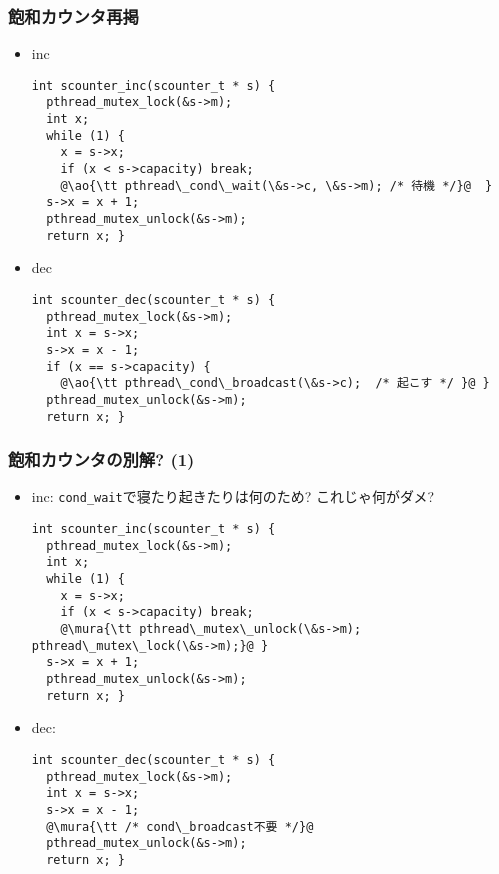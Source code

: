 \documentclass[12pt,dvipdfmx]{beamer}
\begin{document}
\begin{frame}[fragile]
  \frametitle{飽和カウンタ再掲}
  \begin{itemize}
  \item inc
\begin{lstlisting}
int scounter_inc(scounter_t * s) {
  pthread_mutex_lock(&s->m);
  int x;
  while (1) {
    x = s->x;
    if (x < s->capacity) break;
    @\ao{\tt pthread\_cond\_wait(\&s->c, \&s->m); /* 待機 */}@  }
  s->x = x + 1;
  pthread_mutex_unlock(&s->m);
  return x; }
\end{lstlisting}

\item dec
\begin{lstlisting}
int scounter_dec(scounter_t * s) {
  pthread_mutex_lock(&s->m);
  int x = s->x;
  s->x = x - 1;
  if (x == s->capacity) {
    @\ao{\tt pthread\_cond\_broadcast(\&s->c);  /* 起こす */ }@ }
  pthread_mutex_unlock(&s->m);
  return x; }
\end{lstlisting}

\end{itemize}
\end{frame}

\begin{frame}[fragile]
  \frametitle{飽和カウンタの別解? (1)}
  \begin{itemize}
  \item inc: {\tt cond\_wait}で寝たり起きたりは何のため? これじゃ何がダメ?
\begin{lstlisting}
int scounter_inc(scounter_t * s) {
  pthread_mutex_lock(&s->m);
  int x;
  while (1) {
    x = s->x;
    if (x < s->capacity) break;
    @\mura{\tt pthread\_mutex\_unlock(\&s->m); pthread\_mutex\_lock(\&s->m);}@ }
  s->x = x + 1;
  pthread_mutex_unlock(&s->m);
  return x; }
\end{lstlisting}

\item dec:
\begin{lstlisting}
int scounter_dec(scounter_t * s) {
  pthread_mutex_lock(&s->m);
  int x = s->x;
  s->x = x - 1;
  @\mura{\tt /* cond\_broadcast不要 */}@
  pthread_mutex_unlock(&s->m);
  return x; }
\end{lstlisting}

\end{itemize}
\end{frame}
\end{document}
